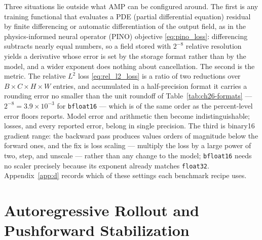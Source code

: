 Three situations lie outside what AMP can be configured around. The first is any training
functional that evaluates a PDE (partial differential equation) residual by finite
differencing or automatic differentiation of the output field, as in the physics-informed
neural operator (PINO) objective \eqref{eq:pino_loss}: differencing subtracts nearly equal
numbers, so a field stored with $2^{-8}$ relative resolution yields a derivative whose error
is set by the storage format rather than by the model, and a wider exponent does nothing about
cancellation. The second is the
metric. The relative $L^2$ loss \eqref{eq:rel_l2_loss} is a ratio of two reductions over
$B\times C\times H\times W$ entries, and accumulated in a half-precision format it carries a
rounding error no smaller than the unit roundoff of Table~\ref{tab:ch26-formats} ---
$2^{-8} = 3.9\times10^{-3}$ for \texttt{bfloat16} --- which is of the same order as the
percent-level error floors 
reports. Model error and arithmetic then become indistinguishable; losses, and every reported
error, belong in single precision. The third is binary16 gradient range: the backward pass
produces values orders of magnitude below the forward ones, and the fix is loss scaling ---
multiply the loss by a large power of two, step, and unscale --- rather than any change to the
model; \texttt{bfloat16} needs no scaler precisely because its exponent already matches
\texttt{float32}. Appendix~\ref{app:d} records which of these settings each benchmark recipe
uses. 

\section{Autoregressive Rollout and Pushforward Stabilization}
\label{sec:ch26-rollout}

